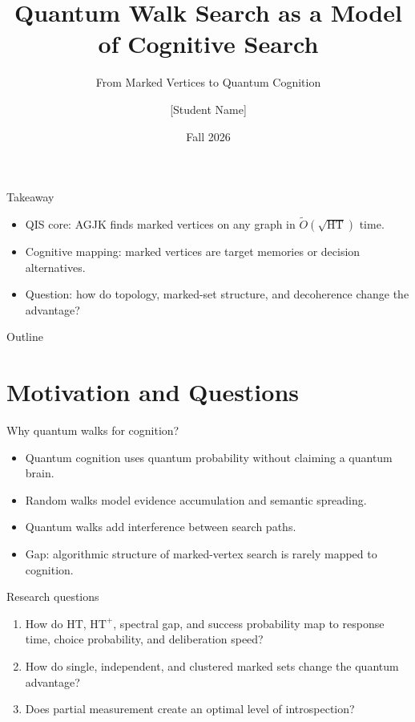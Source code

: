 \documentclass[aspectratio=169,11pt]{beamer}
\title{Quantum Walk Search as a Model of Cognitive Search}
\subtitle{From Marked Vertices to Quantum Cognition}
\author{[Student Name] \quad [Student ID]}
\institute{EE5105 Special Topics in Quantum Information Science\\Prof. Shih-Han Hung}
\date{Fall 2026}
\newcommand{\HT}{\mathrm{HT}}
\newcommand{\HTp}{\mathrm{HT}^{+}}
\newcommand{\Otil}{\widetilde{O}}
\begin{document}
\begin{frame}
  \titlepage
\end{frame}

\begin{frame}{Takeaway}
  \begin{itemize}
    \item QIS core: AGJK finds marked vertices on any graph in $\Otil(\sqrt{\HT})$ time.
    \item Cognitive mapping: marked vertices are target memories or decision alternatives.
    \item Question: how do topology, marked-set structure, and decoherence change the advantage?
  \end{itemize}
\end{frame}

\begin{frame}{Outline}
  \tableofcontents
\end{frame}

\section{Motivation and Questions}

\begin{frame}{Why quantum walks for cognition?}
  \begin{itemize}
    \item Quantum cognition uses quantum probability without claiming a quantum brain.
    \item Random walks model evidence accumulation and semantic spreading.
    \item Quantum walks add interference between search paths.
    \item Gap: algorithmic structure of marked-vertex search is rarely mapped to cognition.
  \end{itemize}
\end{frame}

\begin{frame}{Research questions}
  \begin{enumerate}
    \item How do $\HT$, $\HTp$, spectral gap, and success probability map to response time, choice probability, and deliberation speed?
    \item How do single, independent, and clustered marked sets change the quantum advantage?
    \item Does partial measurement create an optimal level of introspection?
  \end{enumerate}
\end{frame}
\end{document}
